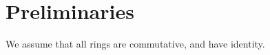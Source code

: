 \chapter{Preliminaries}

\label{Chapter1}

We assume that all rings are commutative, and have identity.



